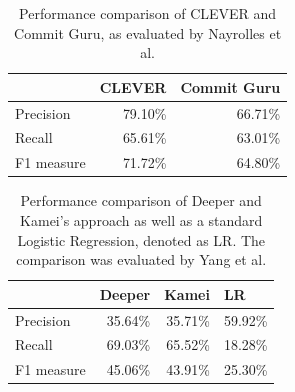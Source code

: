 
\begin{table}[t]
	\centering
	\caption{Performance comparison of CLEVER and Commit Guru, as evaluated by Nayrolles et al. \cite{Nayrolles2018}}
	\begin{tabular}{@{}lrr@{}}
		\toprule
		& \multicolumn{1}{l}{CLEVER} & \multicolumn{1}{l}{Commit Guru} \\ \midrule
		Precision  & 79.10\%                    & 66.71\%                         \\
		Recall     & 65.61\%                    & 63.01\%                         \\
		F1 measure & 71.72\%                    & 64.80\%                         \\ \bottomrule
	\end{tabular}
	\label{tab:perfclever}
\end{table}

\begin{table}[t]
	\centering
	\caption{Performance comparison of Deeper and Kamei's approach as well as a standard Logistic Regression, denoted as LR. The comparison was evaluated by Yang et al. \cite{Yang2015}}
	\begin{tabular}{@{}lrrr@{}}
		\toprule
		& \multicolumn{1}{l}{Deeper} & \multicolumn{1}{l}{Kamei} & \multicolumn{1}{l}{LR} \\ \midrule
		Precision  & 35.64\%                    & 35.71\%                   & 59.92\%                \\
		Recall     & 69.03\%                    & 65.52\%                   & 18.28\%                \\
		F1 measure & 45.06\%                    & 43.91\%                   & 25.30\%                \\ \bottomrule
	\end{tabular}
	\label{tab:perfdeeper}
\end{table}


